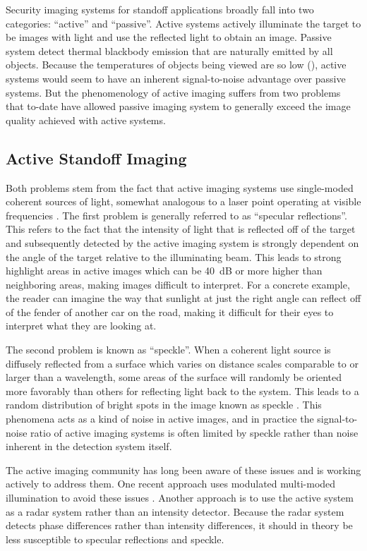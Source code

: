 Security imaging systems for standoff applications broadly fall into two categories: ``active'' and ``passive''.
Active systems actively illuminate the target to be images with light and use the reflected light to obtain an image.
Passive system detect thermal blackbody emission that are naturally emitted by all objects.
Because the temperatures of objects being viewed are so low (), active systems would seem to have an inherent signal-to-noise advantage over passive systems.
But the phenomenology of active imaging suffers from two problems that to-date have allowed passive imaging system to generally exceed the image quality achieved with active systems.

\subsection{Active Standoff Imaging}

Both problems stem from the fact that active imaging systems use single-moded coherent sources of light, somewhat analogous to a laser point operating at visible frequencies \cite{petkie_active_2008}.
The first problem is generally referred to as ``specular reflections''.
This refers to the fact that the intensity of light that is reflected off of the target and subsequently detected by the active imaging system is strongly dependent on the angle of the target relative to the illuminating beam.
This leads to strong highlight areas in active images which can be \SI{40}{\dB} or more higher than neighboring areas, making images difficult to interpret.
For a concrete example, the reader can imagine the way that sunlight at just the right angle can reflect off of the fender of another car on the road, making it difficult for their eyes to interpret what they are looking at.

The second problem is known as ``speckle''.
When a coherent light source is diffusely reflected from a surface which varies on distance scales comparable to or larger than a wavelength, some areas of the surface will randomly be oriented more favorably than others for reflecting light back to the system.
This leads to a random distribution of bright spots in the image known as speckle \cite{goodman_fundamental_1976}.
This phenomena acts as a kind of noise in active images, and in practice the signal-to-noise ratio of active imaging systems is often limited by speckle rather than noise inherent in the detection system itself.

The active imaging community has long been aware of these issues and is working actively to address them.
One recent approach uses modulated multi-moded illumination to avoid these issues \cite{petkie_multimode_2012,patrick_elimination_2012}.
Another approach is to use the active system as a radar system rather than an intensity detector.
Because the radar system detects phase differences rather than intensity differences, it should in theory be less susceptible to specular reflections and speckle.


